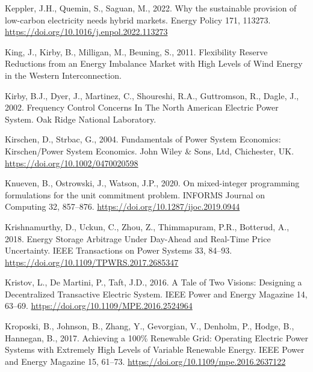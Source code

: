 \documentclass[12pt,a4paper,]{report}
\newlength{\cslhangindent}
\newenvironment{CSLReferences}[2] %
 {%
  \setlength{\parindent}{0pt}
  \ifodd #1 \everypar{\setlength{\hangindent}{\cslhangindent}}\ignorespaces\fi
  \ifnum #2 > 0
  \setlength{\parskip}{#2\baselineskip}
  \fi
 }%
 {}
\begin{document}
\begin{CSLReferences}{1}{0}
\leavevmode{}%
Keppler, J.H., Quemin, S., Saguan, M., 2022. Why the sustainable
provision of low-carbon electricity needs hybrid markets. Energy Policy
171, 113273. \url{https://doi.org/10.1016/j.enpol.2022.113273}

\leavevmode{}%
King, J., Kirby, B., Milligan, M., Beuning, S., 2011. Flexibility
{Reserve Reductions} from an {Energy Imbalance Market} with {High
Levels} of {Wind Energy} in the {Western Interconnection}.

\leavevmode{}%
Kirby, B.J., Dyer, J., Martinez, C., Shoureshi, R.A., Guttromson, R.,
Dagle, J., 2002. Frequency {Control Concerns In The North American
Electric Power System}. {Oak Ridge National Laboratory}.

\leavevmode{}%
Kirschen, D., Strbac, G., 2004. Fundamentals of {Power System
Economics}: {Kirschen}/{Power System Economics}. {John Wiley \& Sons,
Ltd}, {Chichester, UK}. \url{https://doi.org/10.1002/0470020598}

\leavevmode{}%
Knueven, B., Ostrowski, J., Watson, J.P., 2020. On mixed-integer
programming formulations for the unit commitment problem. INFORMS
Journal on Computing 32, 857--876.
\url{https://doi.org/10.1287/ijoc.2019.0944}

\leavevmode{}%
Krishnamurthy, D., Uckun, C., Zhou, Z., Thimmapuram, P.R., Botterud, A.,
2018. Energy {Storage Arbitrage Under Day-Ahead} and {Real-Time Price
Uncertainty}. IEEE Transactions on Power Systems 33, 84--93.
\url{https://doi.org/10.1109/TPWRS.2017.2685347}

\leavevmode{}%
Kristov, L., De Martini, P., Taft, J.D., 2016. A {Tale} of {Two
Visions}: {Designing} a {Decentralized Transactive Electric System}.
IEEE Power and Energy Magazine 14, 63--69.
\url{https://doi.org/10.1109/MPE.2016.2524964}

\leavevmode{}%
Kroposki, B., Johnson, B., Zhang, Y., Gevorgian, V., Denholm, P., Hodge,
B., Hannegan, B., 2017. Achieving a 100\% {Renewable Grid}: {Operating
Electric Power Systems} with {Extremely High Levels} of {Variable
Renewable Energy}. IEEE Power and Energy Magazine 15, 61--73.
\url{https://doi.org/10.1109/mpe.2016.2637122}


\end{CSLReferences}
\end{document}
